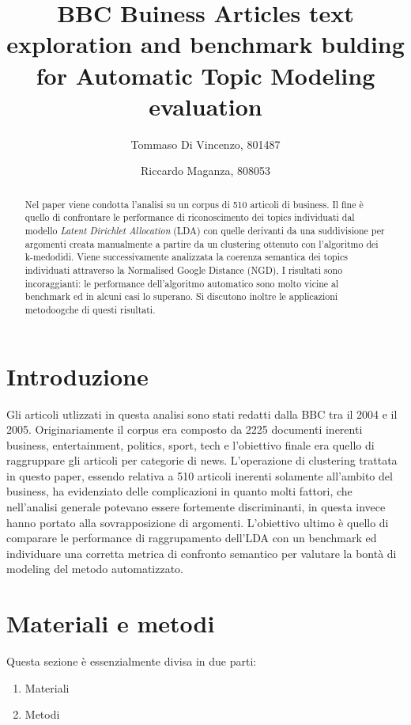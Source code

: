 \documentclass[]{article}
\title{BBC Buiness Articles text exploration and benchmark bulding for Automatic Topic Modeling evaluation}
\author{Tommaso Di Vincenzo, 801487 \and Riccardo Maganza, 808053}
\begin{document}
\maketitle

\begin{abstract}
Nel paper viene condotta l'analisi su un corpus di 510 articoli di business. Il fine è quello di confrontare le performance di riconoscimento dei topics individuati dal modello \textit{Latent Dirichlet Allocation} (LDA) con quelle derivanti da una suddivisione per argomenti creata manualmente a partire da un clustering ottenuto con l'algoritmo dei k-medodidi. Viene successivamente analizzata la coerenza semantica dei topics individuati attraverso la Normalised Google Distance (NGD), I risultati sono incoraggianti: le performance dell'algoritmo automatico sono molto vicine al benchmark ed in alcuni casi lo superano. Si discutono inoltre le applicazioni metodoogche di questi risultati.
\end{abstract}

\section{Introduzione}
Gli articoli utlizzati in questa analisi sono stati redatti dalla BBC tra il 2004 e il 2005. Originariamente il corpus era composto da 2225 documenti inerenti business, entertainment, politics, sport, tech e l'obiettivo finale era quello di raggruppare gli articoli per categorie di news.
L'operazione di clustering trattata in questo paper, essendo relativa a 510 articoli inerenti solamente all'ambito del business, ha evidenziato delle complicazioni in quanto molti fattori, che nell'analisi generale potevano essere fortemente discriminanti, in questa invece hanno portato alla sovrapposizione di argomenti.  
L'obiettivo ultimo è quello di comparare le performance di raggrupamento dell'LDA con un benchmark ed individuare una corretta metrica di confronto semantico per valutare la bontà di modeling del metodo automatizzato.

\section{Materiali e metodi}
Questa sezione \`e essenzialmente divisa in due parti:
\begin{enumerate}
\item Materiali
\item Metodi
\end{enumerate}
\end{document}
